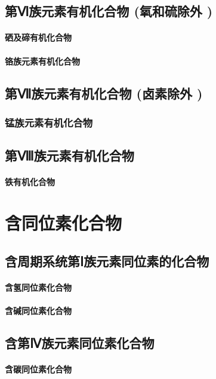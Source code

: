 \documentclass[UTF8]{../03-Chemistry}
\begin{document}
\section{第Ⅵ族元素有机化合物 (氧和硫除外 )}
    \subsubsection{硒及碲有机化合物}
    \subsubsection{铬族元素有机化合物}
\section{第Ⅶ族元素有机化合物 (卤素除外 )}
    \subsection{锰族元素有机化合物}
\section{第Ⅷ族元素有机化合物}
    \subsubsection{铁有机化合物}










\chapter{含同位素化合物}
\section{含周期系统第Ⅰ族元素同位素的化合物}
    \subsubsection{含氢同位素化合物}
    \subsubsection{含碱同位素化合物}
\section{含第Ⅳ族元素同位素化合物}
    \subsubsection{含碳同位素化合物}
\end{document}

